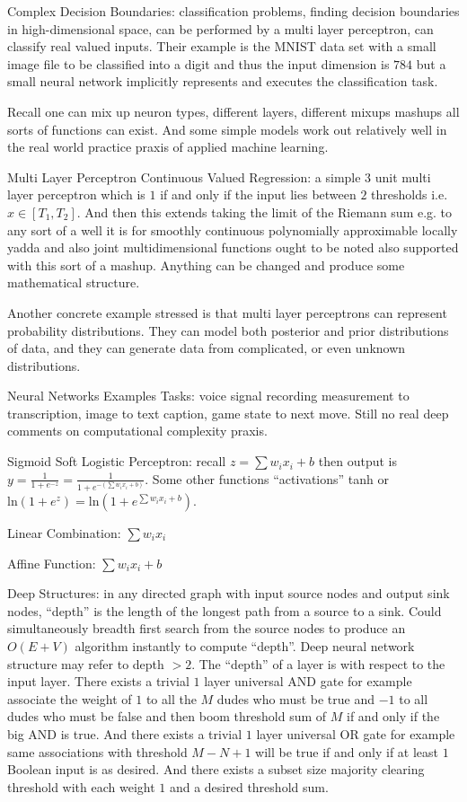 Complex Decision Boundaries: classification problems, finding decision boundaries in high-dimensional space, can be performed by a multi layer perceptron, can classify real valued inputs. Their example is the MNIST data set with a small image file to be classified into a digit and thus the input dimension is $784$ but a small neural network implicitly represents and executes the classification task.

Recall one can mix up neuron types, different layers, different mixups mashups all sorts of functions can exist. And some simple models work out relatively well in the real world practice praxis of applied machine learning.

Multi Layer Perceptron Continuous Valued Regression: a simple $3$ unit multi layer perceptron which is $1$ if and only if the input lies between $2$ thresholds i.e. $x \in [T_1,T_2]$. And then this extends taking the limit of the Riemann sum e.g. to any sort of a well it is for smoothly continuous polynomially approximable locally yadda and also joint multidimensional functions ought to be noted also supported with this sort of a mashup. Anything can be changed and produce some mathematical structure.

Another concrete example stressed is that multi layer perceptrons can represent probability distributions. They can model both posterior and prior distributions of data, and they can generate data from complicated, or even unknown distributions.

Neural Networks Examples Tasks: voice signal recording measurement to transcription, image to text caption, game state to next move. Still no real deep comments on computational complexity praxis.

Sigmoid Soft Logistic Perceptron: recall $z = \sum w_i x_i + b$ then output is $y = \frac{1}{1 + e^{-z}} = \frac{1}{1 + e^{-(\sum w_i x_i + b)}}$. Some other functions ``activations'' tanh or $\text{ln} (1+e^z) = \text{ln} (1+e^{\sum w_i x_i + b})$.

Linear Combination: $\sum w_i x_i$

Affine Function: $\sum w_i x_i + b$

Deep Structures: in any directed graph with input source nodes and output sink nodes, ``depth'' is the length of the longest path from a source to a sink. Could simultaneously breadth first search from the source nodes to produce an $O(E+V)$ algorithm instantly to compute ``depth''.  Deep neural network structure may refer to depth $>2$. The ``depth'' of a layer is with respect to the input layer. There exists a trivial $1$ layer universal AND gate for example associate the weight of $1$ to all the $M$ dudes who must be true and $-1$ to all dudes who must be false and then boom threshold sum of $M$ if and only if the big AND is true. And there exists a trivial $1$ layer universal OR gate for example same associations with threshold $M-N+1$ will be true if and only if at least $1$ Boolean input is as desired. And there exists a subset size majority clearing threshold with each weight $1$ and a desired threshold sum.

